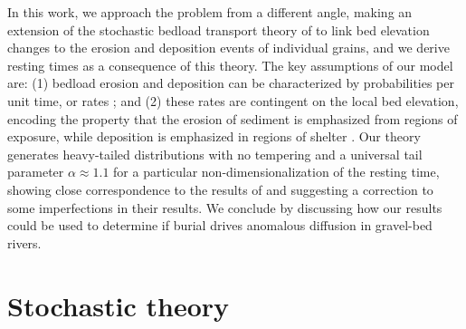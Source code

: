 \documentclass[draft]{agujournal2018}
\begin{document}
In this work, we approach the problem from a different angle, making an extension of the stochastic bedload transport theory of \citet{Ancey2008} to link bed elevation changes to the erosion and deposition events of individual grains, and we derive resting times as a consequence of this theory.
The key assumptions of our model are: (1) bedload erosion and deposition can be characterized by probabilities per unit time, or rates \citep[e.g.][]{Einstein1950, Ancey2008}; and (2) these rates are contingent on the local bed elevation, encoding the property that the erosion of sediment is emphasized from regions of exposure, while deposition is emphasized in regions of shelter \citep[e.g.][]{Sawai1987, Wong2007}.
Our theory generates heavy-tailed distributions with no tempering and a universal tail parameter $\alpha \approx 1.1$ for a particular non-dimensionalization of the resting time, showing close correspondence to the results of \citet{Martin2014} and suggesting a correction to some imperfections in their results.
We conclude by discussing how our results could be used to determine if burial drives anomalous diffusion in gravel-bed rivers.

\section{Stochastic theory}
\end{document}

